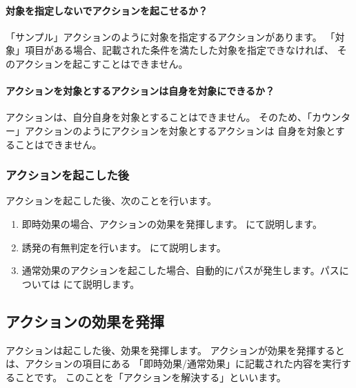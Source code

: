 \documentclass[letterpaper,10pt,dvipdfmx]{sphinxmanual}
\begin{document}
\paragraph{対象を指定しないでアクションを起こせるか？}
\label{\detokenize{common/03-action:id8}}
「サンプル」アクションのように対象を指定するアクションがあります。
「対象」項目がある場合、記載された条件を満たした対象を指定できなければ、
そのアクションを起こすことはできません。


\paragraph{アクションを対象とするアクションは自身を対象にできるか？}
\label{\detokenize{common/03-action:id9}}
アクションは、自分自身を対象とすることはできません。
そのため、「カウンター」アクションのようにアクションを対象とするアクションは
自身を対象とすることはできません。


\subsubsection{アクションを起こした後}
\label{\detokenize{common/03-action:id10}}
アクションを起こした後、次のことを行います。
\begin{enumerate}
%
\item {} 
即時効果の場合、アクションの効果を発揮します。 {\hyperref[\detokenize{common/03-action:action-chance}]{}} にて説明します。

\item {} 
誘発の有無判定を行います。 {\hyperref[\detokenize{common/05-action_detail::doc}]{}} にて説明します。

\item {} 
通常効果のアクションを起こした場合、自動的にパスが発生します。パスについては {\hyperref[\detokenize{common/03-action:action-chance}]{}} にて説明します。

\end{enumerate}


\subsection{アクションの効果を発揮}
\label{\detokenize{common/03-action:action-exe}}\label{\detokenize{common/03-action:id11}}
アクションは起こした後、効果を発揮します。
アクションが効果を発揮するとは、アクションの項目にある
「即時効果/通常効果」に記載された内容を実行することです。
このことを「アクションを解決する」といいます。
\end{document}
